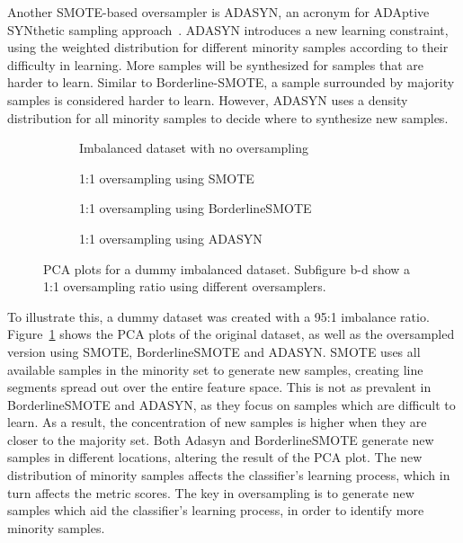 Another SMOTE-based oversampler is ADASYN, an acronym for ADAptive SYNthetic sampling approach~\cite{He2008ADASYN:Learning}. ADASYN introduces a new learning constraint, using the weighted distribution for different minority samples according to their difficulty in learning. More samples will be synthesized for samples that are harder to learn. Similar to Borderline-SMOTE, a sample surrounded by majority samples is considered harder to learn. However, ADASYN uses a density distribution for all minority samples to decide where to synthesize new samples.

\begin{figure}
  \begin{subfigure}[t]{.5\textwidth}
    \centering
    
    \caption{Imbalanced dataset with no oversampling}
  \end{subfigure}
  \hfill
  \begin{subfigure}[t]{.5\textwidth}
    \centering
    
    \caption{1:1 oversampling using SMOTE}
  \end{subfigure}

  \medskip

  \begin{subfigure}[t]{.5\textwidth}
    \centering
    
    \caption{1:1 oversampling using BorderlineSMOTE}
  \end{subfigure}
  \hfill
  \begin{subfigure}[t]{.5\textwidth}
    \centering
    
    \caption{1:1 oversampling using ADASYN}
  \end{subfigure}
\caption{PCA plots for a dummy imbalanced dataset. Subfigure b-d show a 1:1 oversampling ratio using different oversamplers.}
\label{fig:oversampling}
\end{figure}

To illustrate this, a dummy dataset was created with a 95:1 imbalance ratio. Figure~\ref{fig:oversampling} shows the PCA plots of the original dataset, as well as the oversampled version using SMOTE, BorderlineSMOTE and ADASYN. SMOTE uses all available samples in the minority set to generate new samples, creating line segments spread out over the entire feature space. This is not as prevalent in BorderlineSMOTE and ADASYN, as they focus on samples which are difficult to learn. As a result, the concentration of new samples is higher when they are closer to the majority set. Both Adasyn and BorderlineSMOTE generate new samples in different locations, altering the result of the PCA plot. The new distribution of minority samples affects the classifier's learning process, which in turn affects the metric scores. The key in oversampling is to generate new samples which aid the classifier's learning process, in order to identify more minority samples.

